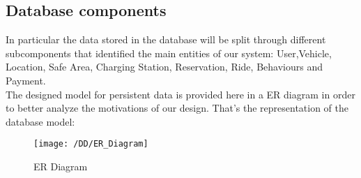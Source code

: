 \subsection{Database components}
In particular the data stored in the database will be split through different subcomponents that identified the main entities of our system:
User,Vehicle, Location, Safe Area, Charging Station, Reservation, Ride, Behaviours and Payment.  
\\The designed model for persistent data is provided here in a ER diagram in order to better analyze the motivations of our design. That's the representation of the database model:
\begin{figure}[!ht]
  \centering
  \vspace{0.2cm}
  \texttt{[image: /DD/ER\_Diagram]}\\
  \vspace{0.4cm}
  \caption{ER Diagram} 
  \label{fig:ER_Diagram} 
\end{figure}

